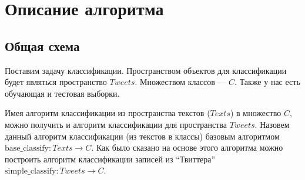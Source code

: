 \chapter{Описание алгоритма}
\label{chap:main}

\section{Общая схема}
Поставим задачу классификации. Пространством объектов для классификации будет являться пространство $Tweets$. Множеством классов --- $C$. Также у нас есть обучающая и тестовая выборки.

Имея алгоритм классификации из пространства текстов ($Texts$) в множество $C$, можно получить и алгоритм классификации для пространства $Tweets$. Назовем данный алгоритм классификации (из текстов в классы) базовым алгоритмом $\mathrm{base\_classify} \colon Texts \rightarrow C$. Как было сказано на основе этого алгоритма можно построить алгоритм классификации записей из ``Твиттера'' $\mathrm{simple\_classify} \colon Tweets \rightarrow C$.

